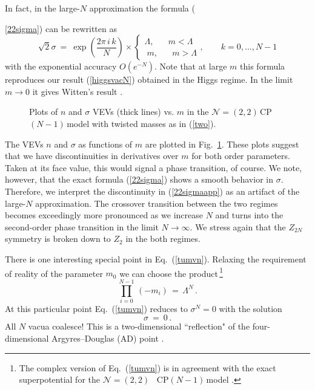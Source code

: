 \documentclass[epsfig,12pt]{article}
\def\beq{\begin{equation}}
\def\eeq{\end{equation}}
\newcommand{\ntt}{${\mathcal N}=(2,2)\,$}
\newcommand{\cpn}{CP$(N-1)\,$}
\def\beq{\begin{equation}}
\def\eeq{\end{equation}}
\newcommand{\ntwot}{${\mathcal N}= \left(2,2\right) $ }
\begin{document}
In fact, in the large-$N$ approximation the formula ({\ref{22sigma}) can be rewritten as
\beq
\sqrt{2}\sigma ~=~ \exp\left( \frac{2\pi\,i\, k}{N}
\right)\times \left\{
\begin{array}{cc}
\Lambda,\;\;\;\;\;\;m <\Lambda\\[1mm]
\;m,\;\;\;\;\;\; m > \Lambda
\end{array},
\right.
 \qquad k=0, ..., N-1
\label{22sigmaapp}
\eeq
with the exponential accuracy   $O\left(e^{-N}\right)$. Note that at large $m$ this formula reproduces our
result (\ref{higgsvacN}) obtained in the Higgs regime. In the limit $m\to 0$ it gives Witten's
result  \cite{W79}.

\begin{figure}
\centerline{}
\caption{\small Plots of $n$ and $\sigma$ VEVs (thick lines) vs. $m$
in the \ntt \cpn model with twisted masses as in (\ref{two}). }
\label{fig22nsigma}
\end{figure}

The  VEVs $n$ and $\sigma$ as functions of $m$ are plotted in Fig.~\ref{fig22nsigma}.
These plots suggest that we have  discontinuities in derivatives over $m$ for both order
parameters. Taken at its face value, this would signal a phase transition, of course. We note, however, that 
the exact formula
(\ref{22sigma}) shows a smooth behavior in $\sigma$. Therefore, we interpret the discontinuity in
(\ref{22sigmaapp}) as an artifact of the large-$N$ approximation. The crossover transition between 
the two regimes becomes exceedingly more pronounced as we increase 
$N$ and turns into the second-order phase transition in the
limit $N\to\infty$. We stress again that the $Z_{2N}$ symmetry is broken down to $Z_2$ in 
the both regimes.

There is one interesting special point in Eq.~(\ref{tumvn}).
Relaxing the requirement of reality of the parameter $m_0$ we can choose the 
product\,\footnote{The complex version of Eq.~(\ref{tumvn}) is in agreement
with the exact superpotential for the \mbox{\ntwot} \cpn model
\cite{AdDVecSal,ChVa,W93,HaHo,Dor}.}
\beq
\prod_{i=0}^{N-1}\,(-m_i) \,=\,\Lambda^N\,.
\label{ADpoint}
\eeq
At this particular point 
 Eq.~(\ref{tumvn}) reduces to $\sigma^N =0$ with the solution
\beq
\sigma ~=~ 0\,.
\label{ADsigma}
\eeq
All $N$ vacua coalesce!  
This is a two-dimensional ``reflection" of the four-dimensional
Argyres--Douglas (AD) point \cite{AD,APSW}.


}
\end{document}
